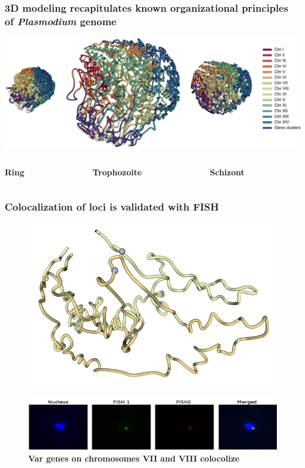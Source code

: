 \documentclass[xcolor=dvipsnames]{beamer}
\begin{document}
\begin{frame}
\frametitle{3D modeling recapitulates known organizational
principles of {\em Plasmodium} genome}

\begin{center}
\includegraphics[width=0.95\linewidth]{figures/3D_var_genes.png}
\end{center}

\begin{columns}
\begin{column}{0.15\textwidth}
\bf \small Ring
\end{column}
\begin{column}{0.25\linewidth}
\bf \small Trophozoite
\end{column}
\begin{column}{0.3\linewidth}
\bf \small Schizont
\end{column}
\end{columns}
\end{frame}

\begin{frame}
\frametitle{Colocalization of loci is validated with FISH}
\begin{figure}
\includegraphics[scale=0.2]{figures/3D_FISH_1.jpg}
\end{figure}
\begin{figure}
\includegraphics[scale=0.45]{figures/FISH_1.jpg}
\caption{\textbf{Var genes on chromosomes VII and VIII colocolize}
}
\end{figure}
\end{frame}
\end{document}
